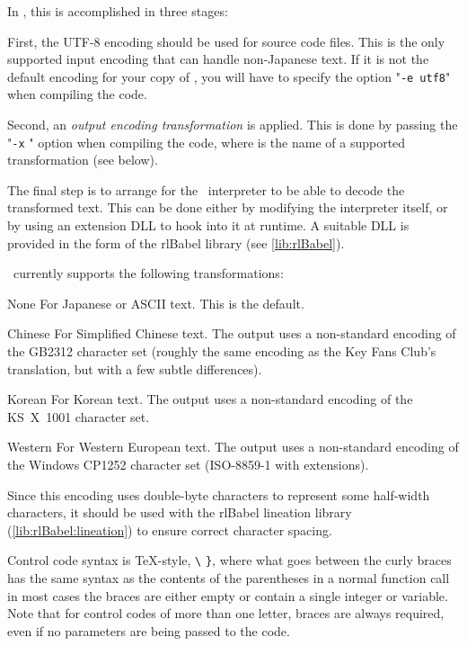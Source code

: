     In \package, this is accomplished in three stages:
    
    First, the UTF-8 encoding should be used for source code files.  This is the 
    only supported input encoding that can handle non-Japanese text.  If it is
    not the default encoding for your copy of \package, you will have to specify
    the option "\texttt{-e utf8}" when compiling the code.
    
    Second, an \emph{output encoding transformation} is applied.  This is done 
    by passing the "\texttt{-x} " option when compiling the code, 
    where  is the name of a supported transformation (see below).
    
    The final step is to arrange for the \reallive\ interpreter to be able to 
    decode the transformed text.  This can be done either by modifying the 
    interpreter itself, or by using an extension DLL to hook into it at 
    runtime.  A suitable DLL is provided in the form of the rlBabel library
    (see \ref{lib:rlBabel}).
    
    \package\ currently supports the following transformations:
    
    \begin{nicelist}
    \item[None]
      For Japanese or ASCII text. This is the default.
    \item[Chinese]
      For Simplified Chinese text. The output uses a non-standard encoding of 
      the GB2312 character set (roughly the same encoding as the Key Fans Club's 
       translation, but with a few subtle differences).
    \item[Korean]
      For Korean text. The output uses a non-standard encoding of the KS~X~1001
      character set.
    \item[Western]
      For Western European text. The output uses a non-standard encoding of
      the Windows CP1252 character set (ISO-8859-1 with extensions).
      
      Since this encoding uses double-byte characters to represent some 
      half-width characters, it should be used with the rlBabel lineation 
      library (\ref{lib:rlBabel:lineation}) to ensure correct character spacing.      
    \end{nicelist}


    Control code syntax is \TeX-style, \lstinline|\|%
    \rawlbrace\lstinline|}|, where what goes between the curly braces has the
    same syntax as the contents of the parentheses in a normal function
    call\,\textemdash\,in most cases the braces are either empty or contain a
    single integer or variable.  Note that for control codes of more than one
    letter, braces are always required, even if no parameters are being passed
    to the code.

